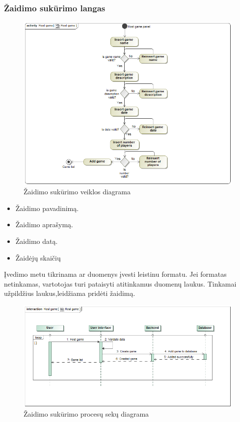 \documentclass{VUMIFPSkursinis}
\begin{document}
	\subsubsection{Žaidimo sukūrimo langas}
			\begin{figure}[H]
				\centering
				\includegraphics[scale=0.5]{img/HostGame_activity}
				\caption{Žaidimo sukūrimo veiklos diagrama}
				\label{img:Hostgame_activity}
			\end{figure}
				\renewcommand{\labelitemi}{$\bullet$}
				\begin{itemize}
					\item Žaidimo pavadinimą.
					\item Žaidimo aprašymą.
					\item Žaidimo datą.
					\item Žaidėjų skaičių
				\end{itemize}
			Įvedimo metu tikrinama ar duomenys įvesti leistinu formatu. Jei formatas 
			netinkamas, vartotojas turi pataisyti atitinkamus duomenų laukus. Tinkamai
			užpildžius laukus,leidžiama pridėti žaidimą.
			\begin{figure}[H]
				\centering
				\includegraphics[scale=0.5]{img/HostGame_sequence}
				\caption{Žaidimo sukūrimo procesų sekų diagrama}
				\label{img:Hostgame_sequence}
			\end{figure}
\end{document}
